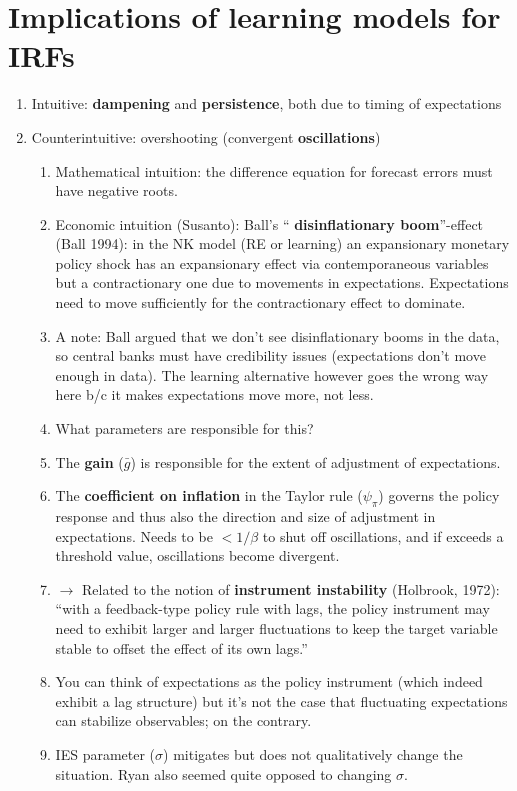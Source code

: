 \documentclass[11pt]{article}
\renewcommand{\[}{\begin{equation}}
\renewcommand{\]}{\end{equation}}
\begin{document}
\section{Implications of learning models for IRFs}
\begin{enumerate}
\item Intuitive: \textbf{dampening} and  \textbf{persistence}, both due to timing of expectations 
\item Counterintuitive: overshooting (convergent  \textbf{oscillations})
\begin{enumerate}
\item Mathematical intuition: the difference equation for forecast errors must have negative roots.
\item Economic intuition (Susanto): Ball's `` \textbf{disinflationary boom}''-effect (Ball 1994): in the NK model (RE or learning) an expansionary monetary policy shock has an expansionary effect via contemporaneous variables but a contractionary one due to movements in expectations. Expectations need to move sufficiently for the contractionary effect to dominate.
\item[] A note: Ball argued that we don't see disinflationary booms in the data, so central banks must have credibility issues (expectations don't move enough in data). The learning alternative however goes the wrong way here b/c it makes expectations move more, not less.
\item What parameters are responsible for this?
\item The  \textbf{gain} ($\bar{g}$) is responsible for the extent of adjustment of expectations.
\item The  \textbf{coefficient on inflation} in the Taylor rule ($\psi_{\pi}$) governs the policy response and thus also the direction and size of adjustment in expectations. Needs to be $<1/\beta$ to shut off oscillations, and if exceeds a threshold value, oscillations become divergent. 
\item[] $\rightarrow$ Related to the notion of \textbf{instrument instability} (Holbrook, 1972): ``with a feedback-type policy rule with lags, the policy instrument may need to exhibit larger and larger fluctuations to keep the target variable stable to offset the effect of its own lags.'' 
\item[] You can think of expectations as the policy instrument (which indeed exhibit a lag structure) but it's not the case that fluctuating expectations can stabilize observables; on the contrary. 
\item IES parameter ($\sigma$) mitigates but does not qualitatively change the situation. Ryan also seemed quite opposed to changing $\sigma$.

\end{enumerate}
\end{enumerate}
\end{document}
